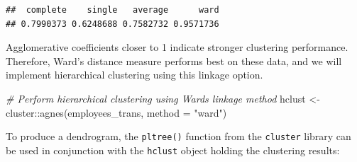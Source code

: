 \documentclass[
]{book}
\newenvironment{Shaded}{\begin{snugshade}}{\end{snugshade}}
\newcommand{\AttributeTok}[1]{\textcolor[rgb]{0.77,0.63,0.00}{#1}}
\newcommand{\CommentTok}[1]{\textcolor[rgb]{0.56,0.35,0.01}{\textit{#1}}}
\newcommand{\ControlFlowTok}[1]{\textcolor[rgb]{0.13,0.29,0.53}{\textbf{#1}}}
\newcommand{\FunctionTok}[1]{\textcolor[rgb]{0.00,0.00,0.00}{#1}}
\newcommand{\NormalTok}[1]{#1}
\newcommand{\OtherTok}[1]{\textcolor[rgb]{0.56,0.35,0.01}{#1}}
\newcommand{\SpecialCharTok}[1]{\textcolor[rgb]{0.00,0.00,0.00}{#1}}
\newcommand{\StringTok}[1]{\textcolor[rgb]{0.31,0.60,0.02}{#1}}
\begin{document}
\begin{Shaded}
\end{Shaded}

\begin{verbatim}
##  complete    single   average      ward 
## 0.7990373 0.6248688 0.7582732 0.9571736
\end{verbatim}

Agglomerative coefficients closer to 1 indicate stronger clustering performance. Therefore, Ward's distance measure performs best on these data, and we will implement hierarchical clustering using this linkage option.

\begin{Shaded}
\begin{Highlighting}[]
\CommentTok{\# Perform hierarchical clustering using Ward\textquotesingle{}s linkage method}
\NormalTok{hclust }\OtherTok{\textless{}{-}}\NormalTok{ cluster}\SpecialCharTok{::}\FunctionTok{agnes}\NormalTok{(employees\_trans, }\AttributeTok{method =} \StringTok{"ward"}\NormalTok{)}
\end{Highlighting}
\end{Shaded}

To produce a dendrogram, the \texttt{pltree()} function from the \texttt{cluster} library can be used in conjunction with the \texttt{hclust} object holding the clustering results:
\end{document}
